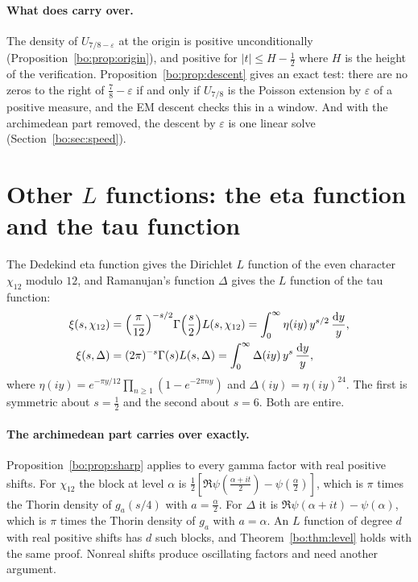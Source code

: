 \paragraph{What does carry over.} The density of $U_{7/8-\varepsilon}$ at the origin is positive unconditionally (Proposition~\ref{bo:prop:origin}), and positive for $|t|\le H-\frac12$ where $H$ is the height of the verification. Proposition~\ref{bo:prop:descent} gives an exact test: there are no zeros to the right of $\frac78-\varepsilon$ if and only if $U_{7/8}$ is the Poisson extension by $\varepsilon$ of a positive measure, and the EM descent checks this in a window. And with the archimedean part removed, the descent by $\varepsilon$ is one linear solve (Section~\ref{bo:sec:speed}).

\section{Other $L$ functions: the eta function and the tau function}\label{bo:sec:otherL}

The Dedekind eta function gives the Dirichlet $L$ function of the even character $\chi_{12}$ modulo $12$, and Ramanujan's function $\Delta$ gives the $L$ function of the tau function:
\begin{align*}
\xi(s,\chi_{12})&=\Bigl(\frac{\pi}{12}\Bigr)^{-s/2}\Gamma\Bigl(\frac s2\Bigr)L(s,\chi_{12})=\int_0^\infty\eta(iy)\,y^{s/2}\,\frac{\mathrm{d} y}{y},\\
\xi(s,\Delta)&=(2\pi)^{-s}\Gamma(s)L(s,\Delta)=\int_0^\infty\Delta(iy)\,y^{s}\,\frac{\mathrm{d} y}{y},
\end{align*}
where $\eta(iy)=e^{-\pi y/12}\prod_{n\ge1}(1-e^{-2\pi ny})$ and $\Delta(iy)=\eta(iy)^{24}$.
The first is symmetric about $s=\frac12$ and the second about $s=6$. Both are entire.

\paragraph{The archimedean part carries over exactly.} Proposition~\ref{bo:prop:sharp} applies to every gamma factor with real positive shifts. For $\chi_{12}$ the block at level $\alpha$ is $\frac12[\Re\psi(\frac{\alpha+it}2)-\psi(\frac\alpha2)]$, which is $\pi$ times the Thorin density of $g_a(s/4)$ with $a=\frac\alpha2$. For $\Delta$ it is $\Re\psi(\alpha+it)-\psi(\alpha)$, which is $\pi$ times the Thorin density of $g_a$ with $a=\alpha$. An $L$ function of degree $d$ with real positive shifts has $d$ such blocks, and Theorem~\ref{bo:thm:level} holds with the same proof. Nonreal shifts produce oscillating factors and need another argument.

